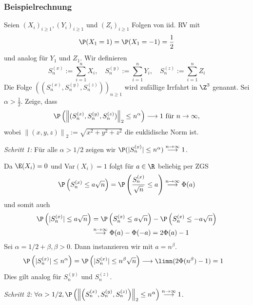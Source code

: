 \subsubsection*{Beispielrechnung}

Seien $(X_i)_{i \geq 1}, (Y_i)_{i \geq 1}$ und $(Z_i)_{i \geq 1}$ Folgen von iid. RV mit
$$\P(X_1 = 1) = \P(X_1 = -1) = \frac{1}{2}$$
und analog für $Y_1$ und $Z_1$. Wir definieren
$$S_n^{(x)} := \sum_{i=1}^n X_i, \quad S_n^{(y)} := \sum_{i=1}^n Y_i, \quad S_n^{(z)} := \sum_{i=1}^n Z_i$$
Die Folge $\left((S_n^{(x)}, S_n^{(y)}, S_n^{(z)})\right)_{n \geq 1}$ wird zufällige Irrfahrt in $\Z^3$ genannt. Sei $\alpha > \frac{1}{2}$. Zeige, dass
$$\P\left(\left\lVert(S_n^{(x)}, S_n^{(y)}, S_n^{(z)})\right\rVert_2 \leq n^\alpha\right) \longrightarrow 1 \text{ für } n \to \infty,$$
wobei $\left\lVert(x,y,z)\right\rVert_2 := \sqrt{x^2+y^2+z^2}$ die euklidische Norm ist.

\textit{Schritt 1: } Für alle $\alpha > 1/2$ zeigen wir $\P(|S_n^{(x)}| \leq n^\alpha) \overset{n \to \infty}{\longrightarrow} 1$.

Da $\E(X_i) = 0$ und Var$(X_i) = 1$ folgt für $a \in \R$ beliebig per ZGS
$$\P\left(S_n^{(x)} \leq a \sqrt{n}\right) = \P\left(\frac{S_n^{(x)}}{\sqrt{n}} \leq a\right) \overset{n \to \infty}{\longrightarrow} \Phi(a)$$
und somit auch
\begin{align*}
    \P\left(|S_n^{(x)}| \leq a\sqrt{n}\right) &= \P\left(S_n^{(x)} \leq a \sqrt{n}\right) -\P\left(S_n^{(x)} \leq - a \sqrt{n}\right) \\
    &\overset{n \to \infty}{\longrightarrow} \Phi(a) - \Phi(-a) = 2\Phi(a)-1
\end{align*}
Sei $\alpha = 1/2 + \beta, \beta > 0$. Dann instanzieren wir mit $a = n^\beta$.
\begin{align*}
    \P\left(|S_n^{(x)}| \leq n^\alpha\right) &= \P\left(|S_n^{(x)}| \leq n^\beta\sqrt{n}\right) \longrightarrow \limn(2 \Phi(n^\beta)-1) = 1
\end{align*}
Dies gilt analog für $S_n^{(y)}$ und $S_n^{(z)}$.

\textit{Schritt 2:} $\forall \alpha > 1/2, \P\left(\left\lVert\left(S_n^{(x)}, S_n^{(y)}, S_n^{(z)}\right)\right\rVert_2 \leq n^\alpha\right) \overset{n \to \infty}{\longrightarrow} 1$.

